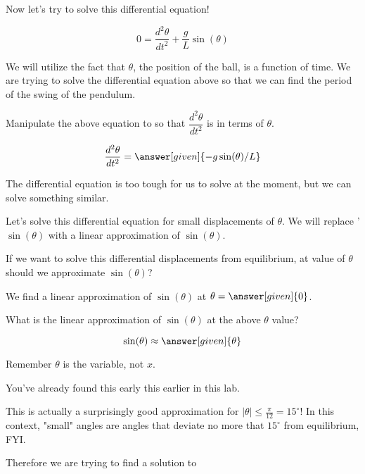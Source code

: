 \documentclass[handout,nooutcomes]{ximera}
\begin{document}
\begin{example}
\begin{explanation}
Now let's try to solve this differential equation!

\[
0 = \dfrac{d^2 \theta}{d t^2}  + \dfrac{g}{L} \sin(\theta)
\]

We will utilize the fact that $\theta$, the position of the ball,
is a function of time. We are trying to solve the differential
equation above so that we can find the period of the swing of the pendulum.

Manipulate the above equation to so that $\dfrac{d^2 \theta}{d t^2}$ is in terms of $\theta$.

\[
\dfrac{d^2 \theta}{d t^2}  = \answer[given]{-g\sin(\theta)/L}
\]

The differential equation is too tough for us to solve at the moment,
but we can solve something similar.

Let's solve this differential equation for small displacements
of $\theta$. We will replace '$\sin(\theta)$ with a linear approximation
of $\sin(\theta)$.

\begin{question}
If we want to solve this differential displacements from equilibrium, at value of $\theta$ should we approximate $\sin(\theta)$?

\begin{prompt}
We find a linear approximation of $\sin(\theta)$ at $\theta = \answer[given]{0}$.
\end{prompt}
\end{question}

\begin{question}
What is the linear approximation of $\sin(\theta)$ at the above $\theta$ value?

\begin{prompt}
\[
\sin(\theta) \approx \answer[given]{\theta}
\]
\end{prompt}

\begin{hint}
Remember $\theta$ is the variable, not $x$.
\end{hint}
\begin{hint}
You've already found this early this earlier in this lab.
\end{hint}
\end{question}

This is actually a surprisingly good approximation for
$|\theta|\leq \frac{\pi}{12} = 15^\circ$! In this context, "small" angles
are angles that deviate no more that $15^\circ$ from equilibrium, FYI.

Therefore we are trying to find a solution to


\end{explanation}
\end{example}
\end{document}
